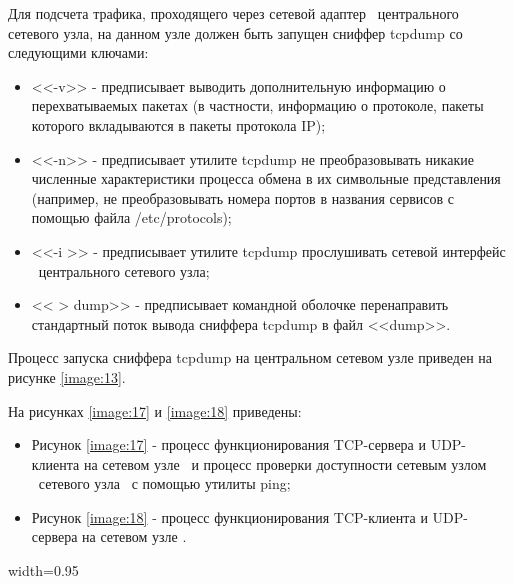 	Для подсчета трафика, проходящего через сетевой адаптер \midethf\ центрального сетевого узла, на данном узле должен
	быть запущен сниффер tcpdump со следующими ключами:

	\begin{itemize}

		\item <<-v>> - предписывает выводить дополнительную информацию о перехватываемых пакетах (в частности,
		информацию о протоколе, пакеты которого вкладываются в пакеты протокола IP);

		\item <<-n>> - предписывает утилите tcpdump не преобразовывать никакие численные характеристики процесса обмена
		в их символьные представления (например, не преобразовывать номера портов в названия сервисов с помощью файла
		/etc/protocols);

		\item <<-i \midethf>> - предписывает утилите tcpdump прослушивать сетевой интерфейс \midethf\ центрального
		сетевого узла;

		\item << > dump>> - предписывает командной оболочке перенаправить стандартный поток вывода сниффера tcpdump
		в файл <<dump>>.

	\end{itemize}

	Процесс запуска сниффера tcpdump на центральном сетевом узле приведен на рисунке \ref{image:13}.


	На рисунках \ref{image:17} и \ref{image:18} приведены:

	\begin{itemize}

		\item Рисунок \ref{image:17} - процесс функционирования TCP-сервера и UDP-клиента на сетевом узле \first\
		и процесс проверки доступности сетевым узлом \first\ сетевого узла \second\ с помощью утилиты ping;
		\item Рисунок \ref{image:18} - процесс функционирования TCP-клиента и UDP-сервера на сетевом узле \second.

	\end{itemize}

	{width=0.95\textwidth}

